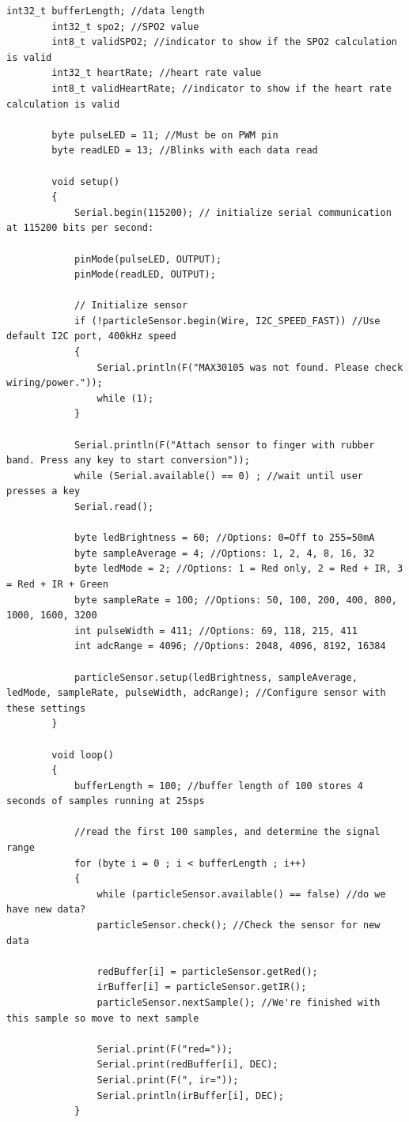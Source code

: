 \begin{flushleft}
\begin{lstlisting}[style=CStyle]
		int32_t bufferLength; //data length
		int32_t spo2; //SPO2 value
		int8_t validSPO2; //indicator to show if the SPO2 calculation is valid
		int32_t heartRate; //heart rate value
		int8_t validHeartRate; //indicator to show if the heart rate calculation is valid
		
		byte pulseLED = 11; //Must be on PWM pin
		byte readLED = 13; //Blinks with each data read
		
		void setup()
		{
			Serial.begin(115200); // initialize serial communication at 115200 bits per second:
			
			pinMode(pulseLED, OUTPUT);
			pinMode(readLED, OUTPUT);
			
			// Initialize sensor
			if (!particleSensor.begin(Wire, I2C_SPEED_FAST)) //Use default I2C port, 400kHz speed
			{
				Serial.println(F("MAX30105 was not found. Please check wiring/power."));
				while (1);
			}
			
			Serial.println(F("Attach sensor to finger with rubber band. Press any key to start conversion"));
			while (Serial.available() == 0) ; //wait until user presses a key
			Serial.read();
			
			byte ledBrightness = 60; //Options: 0=Off to 255=50mA
			byte sampleAverage = 4; //Options: 1, 2, 4, 8, 16, 32
			byte ledMode = 2; //Options: 1 = Red only, 2 = Red + IR, 3 = Red + IR + Green
			byte sampleRate = 100; //Options: 50, 100, 200, 400, 800, 1000, 1600, 3200
			int pulseWidth = 411; //Options: 69, 118, 215, 411
			int adcRange = 4096; //Options: 2048, 4096, 8192, 16384
			
			particleSensor.setup(ledBrightness, sampleAverage, ledMode, sampleRate, pulseWidth, adcRange); //Configure sensor with these settings
		}
		
		void loop()
		{
			bufferLength = 100; //buffer length of 100 stores 4 seconds of samples running at 25sps
			
			//read the first 100 samples, and determine the signal range
			for (byte i = 0 ; i < bufferLength ; i++)
			{
				while (particleSensor.available() == false) //do we have new data?
				particleSensor.check(); //Check the sensor for new data
				
				redBuffer[i] = particleSensor.getRed();
				irBuffer[i] = particleSensor.getIR();
				particleSensor.nextSample(); //We're finished with this sample so move to next sample
				
				Serial.print(F("red="));
				Serial.print(redBuffer[i], DEC);
				Serial.print(F(", ir="));
				Serial.println(irBuffer[i], DEC);
			}
			

\end{lstlisting}
\end{flushleft}
